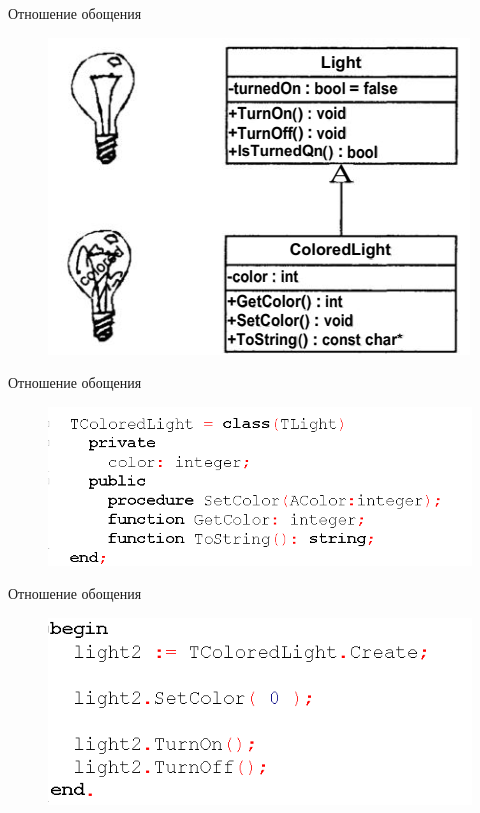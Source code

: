 \documentclass{beamer}
\begin{document}
\begin{frame}{Отношение обощения}
\begin{figure}[h]
\centering
\includegraphics[scale=0.75]{images/lec04-pic10.png}
\end{figure}
\end{frame}

\begin{frame}{Отношение обощения}
\begin{figure}[h]
\centering
\includegraphics[scale=0.7]{images/lec04-pic11.png}
\end{figure}
\end{frame}

\begin{frame}{Отношение обощения}
\begin{figure}[h]
\centering
\includegraphics[scale=0.75]{images/lec04-pic12.png}
\end{figure}
\end{frame}
\end{document}
